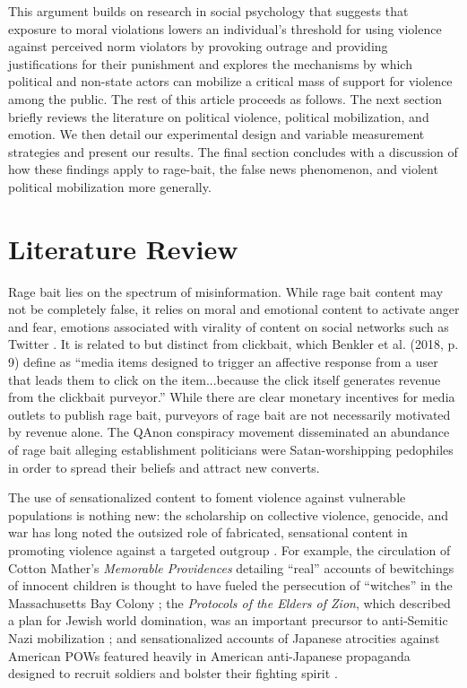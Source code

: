 \documentclass[12pt, letterpaper]{article}
\begin{document}
This argument builds on research in social psychology that suggests that exposure to moral violations lowers an individual's threshold for using violence against perceived norm violators by provoking outrage and providing justifications for their punishment \citep{baumeister1999evil,beck1999prisoners,crockett2017moral, fiske2014virtuous, goldberg1999rage} and explores the mechanisms by which political and non-state actors can mobilize a critical mass of support for violence among the public. The rest of this article proceeds as follows. The next section briefly reviews the literature on political violence, political mobilization, and emotion. We then detail our experimental design and variable measurement strategies and present our results. The final section concludes with a discussion of how these findings apply to rage-bait, the false news phenomenon, and violent political mobilization more generally.

\section{Literature Review}

Rage bait lies on the spectrum of misinformation. While rage bait content may not be completely false, it relies on moral and emotional content to activate anger and fear, emotions associated with virality of content on social networks such as Twitter \citep{brady2017emotion}. It is related to but distinct from clickbait, which Benkler et al. (2018, p. 9) define as ``media items designed to trigger an affective response from a user that leads them to click on the item...because the click itself generates revenue from the clickbait purveyor.'' While there are clear monetary incentives for media outlets to publish rage bait, purveyors of rage bait are not necessarily motivated by revenue alone. The QAnon conspiracy movement disseminated an abundance of rage bait alleging establishment politicians were Satan-worshipping pedophiles in order to spread their beliefs and attract new converts. 

The use of sensationalized content to foment violence against vulnerable populations is nothing new: the scholarship on collective violence, genocide, and war has long noted the outsized role of fabricated, sensational content in promoting violence against a targeted outgroup \citep{charny2019can, cohn1967warrant, dower1986war, fein1979accounting, herf2006jewish, hill1995delusion, goldhagen1997hitler, goldhagen2009worse, tsesis2002destructive}. For example, the circulation of Cotton Mather's \textit{Memorable Providences} detailing ``real'' accounts of bewitchings of innocent children is thought to have fueled the persecution of ``witches'' in the Massachusetts Bay Colony \citep{hill1995delusion}; the \textit{Protocols of the Elders of Zion}, which described a plan for Jewish world domination, was an important precursor to anti-Semitic Nazi mobilization \citep{cohn1967warrant,herf2006jewish}; and sensationalized accounts of Japanese atrocities against American POWs featured heavily in American anti-Japanese propaganda designed to recruit soldiers and bolster their fighting spirit \citep{dower1986war}. 
\end{document}
